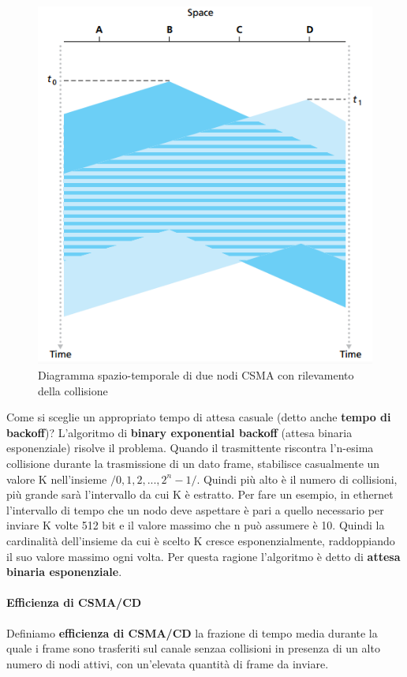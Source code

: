 \documentclass[11pt,a4paper]{article}
\begin{document}
\begin{figure}
	\begin{center}
		\includegraphics[scale=0.6]{img/080.png}
		\caption{Diagramma spazio-temporale di due nodi CSMA con rilevamento della collisione}
		\label{fig: 081}
	\end{center}
\end{figure}
Come si sceglie un appropriato tempo di attesa casuale (detto anche \textbf{tempo di backoff})? L'algoritmo di \textbf{binary exponential backoff} (attesa binaria esponenziale) risolve il problema. Quando il trasmittente riscontra l'n-esima collisione durante la trasmissione di un dato frame, stabilisce casualmente un valore K nell'insieme $/{0, 1, 2, ..., 2^{n} - 1/}$. Quindi più alto è il numero di collisioni, più grande sarà l'intervallo da cui K è estratto. Per fare un esempio, in ethernet l'intervallo di tempo che un nodo deve aspettare è pari a quello necessario per inviare K volte 512 bit e il valore massimo che n può assumere è 10. Quindi la cardinalità dell'insieme da cui è scelto K cresce esponenzialmente, raddoppiando il suo valore massimo ogni volta. Per questa ragione l'algoritmo è detto di \textbf{attesa binaria esponenziale}.

\paragraph{Efficienza di CSMA/CD}
Definiamo \textbf{efficienza di CSMA/CD} la frazione di tempo media durante la quale i frame sono trasferiti sul canale senzaa collisioni in presenza di un alto numero di nodi attivi, con un'elevata quantità di frame da inviare.
\end{document}
